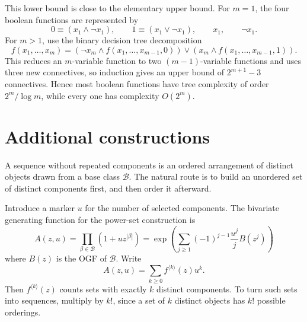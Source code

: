 This lower bound is close to the elementary upper bound. For $m = 1$, the four boolean
functions are represented by
\begin{equation*}
    0 \equiv (x_{1}\wedge \neg x_{1}), \qquad
    1 \equiv (x_{1}\vee \neg x_{1}), \qquad
    x_{1}, \qquad \neg x_{1}.
\end{equation*}
For $m > 1$, use the binary decision tree decomposition
\begin{equation*}
    f(x_{1}, \dots, x_{m})
        =
        (\neg x_{m}\wedge f(x_{1}, \dots, x_{m - 1}, 0))
        \vee
        (x_{m}\wedge f(x_{1}, \dots, x_{m - 1}, 1)).
\end{equation*}
This reduces an $m$-variable function to two $(m - 1)$-variable functions and uses three new
connectives, so induction gives an upper bound of $2^{m + 1} - 3$ connectives. Hence most
boolean functions have tree complexity of order $2^{m}/\log m$, while every one has
complexity $O(2^{m})$.

\section{Additional constructions}

A sequence without repeated components is an ordered arrangement of distinct objects drawn
from a base class $\mathcal{B}$. The natural route is to build an unordered set of distinct
components first, and then order it afterward.

Introduce a marker $u$ for the number of selected components. The bivariate generating
function for the power-set construction is
\begin{equation*}
    A(z, u)
        = \prod_{\beta \in \mathcal{B}}\left(1 + uz^{|\beta|}\right)
        = \exp\left(\sum_{j \geq 1}(-1)^{j - 1} \frac{u^{j}}{j}B(z^{j})\right)
\end{equation*}
where $B(z)$ is the OGF of $\mathcal{B}$. Write
\begin{equation*}
    A(z, u) = \sum_{k \geq 0} f^{\langle k \rangle}(z)u^{k}.
\end{equation*}
Then $f^{\langle k \rangle}(z)$ counts sets with exactly $k$ distinct components. To turn such
sets into sequences, multiply by $k!$, since a set of $k$ distinct objects has $k!$ possible
orderings.

